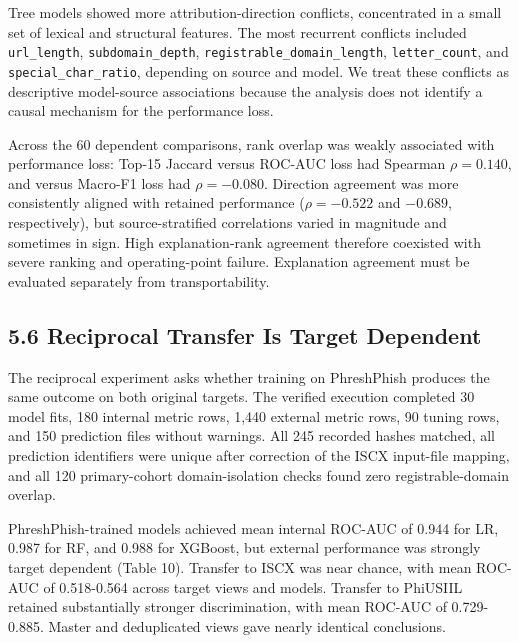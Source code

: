 \documentclass[
  10pt,
]{article}
\begin{document}
Tree models showed more attribution-direction conflicts, concentrated in
a small set of lexical and structural features. The most recurrent
conflicts included \texttt{url\_length}, \texttt{subdomain\_depth},
\texttt{registrable\_domain\_length}, \texttt{letter\_count}, and
\texttt{special\_char\_ratio}, depending on source and model. We treat
these conflicts as descriptive model-source associations because the
analysis does not identify a causal mechanism for the performance loss.

Across the 60 dependent comparisons, rank overlap was weakly associated
with performance loss: Top-15 Jaccard versus ROC-AUC loss had Spearman
\(\rho=0.140\), and versus Macro-F1 loss had \(\rho=-0.080\). Direction
agreement was more consistently aligned with retained performance
(\(\rho=-0.522\) and \(-0.689\), respectively), but source-stratified
correlations varied in magnitude and sometimes in sign. High
explanation-rank agreement therefore coexisted with severe ranking and
operating-point failure. Explanation agreement must be evaluated
separately from transportability.

\subsection{5.6 Reciprocal Transfer Is Target
Dependent}\label{reciprocal-transfer-is-target-dependent}

The reciprocal experiment asks whether training on PhreshPhish produces
the same outcome on both original targets. The verified execution
completed 30 model fits, 180 internal metric rows, 1,440 external metric
rows, 90 tuning rows, and 150 prediction files without warnings. All 245
recorded hashes matched, all prediction identifiers were unique after
correction of the ISCX input-file mapping, and all 120 primary-cohort
domain-isolation checks found zero registrable-domain overlap.

PhreshPhish-trained models achieved mean internal ROC-AUC of 0.944 for
LR, 0.987 for RF, and 0.988 for XGBoost, but external performance was
strongly target dependent (Table 10). Transfer to ISCX was near chance,
with mean ROC-AUC of 0.518-0.564 across target views and models.
Transfer to PhiUSIIL retained substantially stronger discrimination,
with mean ROC-AUC of 0.729-0.885. Master and deduplicated views gave
nearly identical conclusions.
\end{document}
